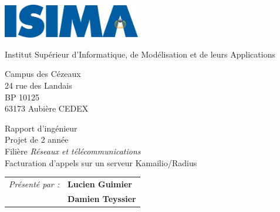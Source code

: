 \thispagestyle{empty}

\includegraphics[width=6cm]{isima.png}

\vspace{0.5cm}

\begin{minipage}{4cm}
\begin{flushleft}
	Institut Supérieur d’Informatique, de Modélisation et de leurs Applications
	
	\vspace{0.5cm}
	
	\small{ Campus des Cézeaux \\ 24 rue des Landais \\ BP 10125 \\ 63173 Aubière CEDEX }
\end{flushleft}
\end{minipage}

\vspace{4cm}

\begin{center}
	Rapport d’ingénieur \\
	Projet de 2{\ieme} année \\
	Filière {\em{Réseaux et télécommunications}} \\
	\Large{Facturation d’appels sur un serveur Kamailio/Radius}
\end{center}

\vspace{2cm}

\large{
\begin{tabular}{ll}
\textit{Présenté par :} & \textbf{Lucien Guimier} \\
& \textbf{Damien Teyssier}
\end{tabular}
}

\todo
